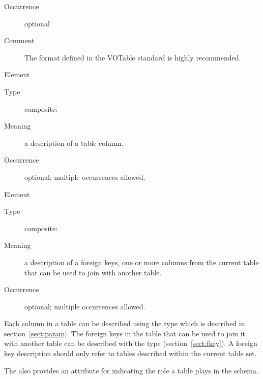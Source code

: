 \documentclass[11pt,a4paper]{ivoa}
\begin{document}
\begin{generated}
\begin{bigdescription}
\begin{description}
\item[Occurrence] optional
\item[Comment] 
                  The format defined in the VOTable standard is highly
                  recommended. 
               

\end{description}
\item[Element \xmlel{column}]
\begin{description}
\item[Type] composite: 
\item[Meaning] 
                  a description of a table column.
               
\item[Occurrence] optional; multiple occurrences allowed.

\end{description}
\item[Element \xmlel{foreignKey}]
\begin{description}
\item[Type] composite: 
\item[Meaning] 
                  a description of a foreign keys, one or more columns
                  from the current table that can be used to join with 
                  another table.  
               
\item[Occurrence] optional; multiple occurrences allowed.

\end{description}


\end{bigdescription}\endgroup

\endgroup
\end{generated}





Each column in a table can be described using the
 type which is described in
section~\ref{sect:param}.  The foreign keys in the table that
can be used to join it with another table can be described with the
 type (section~\ref{sect:fkey}).
A foreign key description should only refer to tables described within
the current table set.  



The  also provides an attribute for indicating
the role a table plays in the schema.
\end{document}
